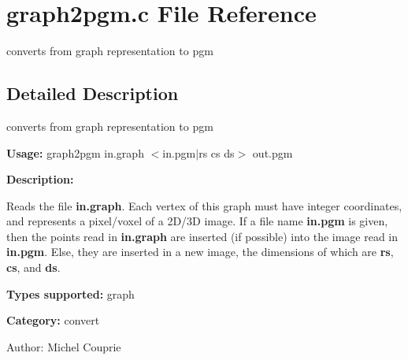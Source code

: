 \section{graph2pgm.c File Reference}
\label{graph2pgm_8c}
converts from graph representation to pgm 



\subsection{Detailed Description}
converts from graph representation to pgm 

{\bf Usage:} graph2pgm in.graph $<$in.pgm$|$rs cs ds$>$ out.pgm

{\bf Description:}

Reads the file {\bf in.graph}. Each vertex of this graph must have integer coordinates, and represents a pixel/voxel of a 2D/3D image. If a file name {\bf in.pgm} is given, then the points read in {\bf in.graph} are inserted (if possible) into the image read in {\bf in.pgm}. Else, they are inserted in a new image, the dimensions of which are {\bf rs}, {\bf cs}, and {\bf ds}.

{\bf Types supported:} graph

{\bf Category:} convert

\begin{Desc}
\item[Author:]Michel Couprie \end{Desc}
